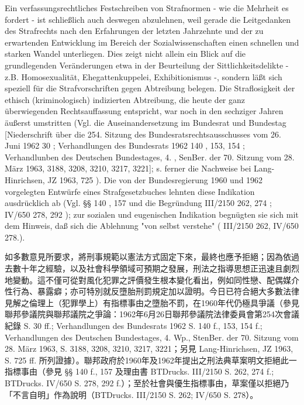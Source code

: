 \documentclass[12pt]{article}
\begin{document}
\syncleft
\begin{sourcepara}
Ein verfassungsrechtliches Festschreiben von Strafnormen - wie die Mehrheit es fordert - ist schließlich auch deswegen abzulehnen, weil gerade die Leitgedanken des Strafrechts nach den Erfahrungen der letzten Jahrzehnte und der zu erwartenden Entwicklung im Bereich der Sozialwissenschaften einen schnellen und starken Wandel unterliegen. Dies zeigt nicht allein ein Blick auf die grundlegenden Veränderungen etwa in der Beurteilung der Sittlichkeitsdelikte - z.B. Homosexualität, Ehegattenkuppelei, Exhibitionismus -, sondern läßt sich speziell für die Strafvorschriften gegen Abtreibung belegen. Die Straflosigkeit der ethisch (kriminologisch) indizierten Abtreibung, die heute der ganz überwiegenden Rechtsauffassung entspricht, war noch in den sechziger Jahren äußerst umstritten (Vgl. die Auseinandersetzung im Bundesrat und Bundestag [Niederschrift über die 254. Sitzung des Bundesratsrechtsausschusses vom 26. Juni 1962 \abbrS{} 30 \abbrFF{}; Verhandlungen des Bundesrats 1962 \abbrS{} 140 \abbrF{}, 153, 154 \abbrF{}; Verhandlunben des Deutschen Bundestages, 4. \abbrWp{}, SenBer. der 70. Sitzung vom 28. März 1963, \abbrS{} 3188, 3208, 3210, 3217, 3221]; s. ferner die Nachweise bei Lang-Hinrichsen, JZ 1963, \abbrS{} 725 \abbrFF{}). Die von der Bundesregierung 1960 und 1962 vorgelegten Entwürfe eines Strafgesetzbuches lehnten diese Indikation ausdrücklich ab (Vgl. §§ 140 \abbrF{}, 157 und die Begründung \abbrBTDrucks{} III/2150 \abbrS{} 262, 274 \abbrF{}; \abbrBTDrucks{} IV/650 \abbrS{} 278, 292 \abbrF{}); zur sozialen und eugenischen Indikation begnügten sie sich mit dem Hinweis, daß sich die Ablehnung "von selbst verstehe" (\abbrBTDrucks{} III/2150 \abbrS{} 262, IV/650 \abbrS{} 278.).
\end{sourcepara}
\begin{transpara}
如多數意見所要求，將刑事規範以憲法方式固定下來，最終也應予拒絕；因為依過去數十年之經驗，以及社會科學領域可預期之發展，刑法之指導思想正迅速且劇烈地變動。這不僅可從對風化犯罪之評價發生根本變化看出，例如同性戀、配偶媒介性行為、暴露癖；亦可特別就反墮胎刑罰規定加以證明。今日已符合絕大多數法律見解之倫理上（犯罪學上）有指標事由之墮胎不罰，在1960年代仍極具爭議（參見聯邦參議院與聯邦議院之爭論：1962年6月26日聯邦參議院法律委員會第254次會議紀錄 S. 30 ff.; Verhandlungen des Bundesrats 1962 S. 140 f., 153, 154 f.; Verhandlungen des Deutschen Bundestages, 4. Wp., StenBer. der 70. Sitzung vom 28. März 1963, S. 3188, 3208, 3210, 3217, 3221；另見 Lang-Hinrichsen, JZ 1963, S. 725 ff. 所列證據）。聯邦政府於1960年及1962年提出之刑法典草案明文拒絕此一指標事由（參見 §§ 140 f., 157 及理由書 BTDrucks. III/2150 S. 262, 274 f.; BTDrucks. IV/650 S. 278, 292 f.）；至於社會與優生指標事由，草案僅以拒絕乃「不言自明」作為說明（BTDrucks. III/2150 S. 262; IV/650 S. 278）。
\end{transpara}
\end{document}
